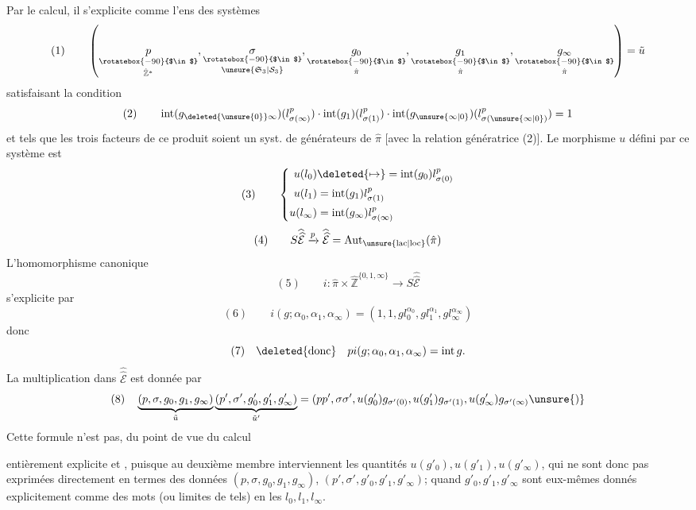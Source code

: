 Par le calcul, il s'explicite comme l'ens des systèmes
\[
(1)\qquad\left(\underset{\hat{\mathbb Z}^{*}}{\underset{\rotatebox{-90}{$\in$}}{p}},\underset{\unsure{\mathfrak S_3|\mathcal S_3}}{\underset{\rotatebox{-90}{$\in$}}{\sigma}},\underset{\hat\pi}{\underset{\rotatebox{-90}{$\in$}}{g_0}},\underset{\hat\pi}{\underset{\rotatebox{-90}{$\in$}}{g_1}},\underset{\hat\pi}{\underset{\rotatebox{-90}{$\in$}}{g_\infty}}\right)=\tilde u
\]
satisfaisant la condition
\[
(2)\qquad\operatorname{int}(g_{\deleted{\unsure{0}}\infty})(l_{\sigma(\infty)}^p)\cdot\operatorname{int}(g_1)(l_{\sigma(1)}^p)\cdot\operatorname{int}(g_{\unsure{\infty|0}})(l_{\sigma(\unsure{\infty|0})}^p)=1
\]
et tels que les trois facteurs de ce produit soient un syst. de générateurs de $\hat\pi$ [avec la relation génératrice (2)]. Le morphisme $u$ défini par ce  système est
\[
(3)\qquad\left\{\begin{aligned}
u(l_0)&\deleted{\mapsto}=\operatorname{int}(g_0)l_{\sigma(0)}^p\\
u(l_1)&=\operatorname{int}(g_1)l_{\sigma(1)}^p\\
u(l_\infty)&=\operatorname{int}(g_\infty)l_{\sigma(\infty)}^p
\end{aligned}\right.
\]
\[
(4)\qquad S\widehat{\widehat{\mathcal E}}\xrightarrow{p}\widehat{\widehat{\mathcal E}}=\operatorname{Aut}_{\unsure{\mathrm{lac}|\mathrm{loc}}}(\hat\pi)
\]
L'homomorphisme canonique
\[
(5)\qquad i:\hat\pi\times\hat{\mathbb Z}^{\{0,1,\infty\}}\longrightarrow S\widehat{\widehat{\mathcal E}}
\]
s'explicite par
\[
(6)\qquad i(g;\alpha_0,\alpha_1,\alpha_\infty)=(1,1,gl_0^{\alpha_0},gl_1^{\alpha_1},gl_\infty^{\alpha_\infty})
\]
donc
\[
(7)\quad\deleted{\text{donc}}\quad pi(g;\alpha_0,\alpha_1,\alpha_\infty)=\operatorname{int}g.
\]
La multiplication dans $\widehat{\widehat{\mathcal E}}$ est donnée par
\[
(8)\quad\underbrace{(p,\sigma,g_0,g_1,g_\infty)}_{\tilde u}\underbrace{(p',\sigma',g'_0,g'_1,g'_\infty)}_{\tilde u'}=(pp',\sigma\sigma',u(g'_0)g_{\sigma'(0)},u(g'_1)g_{\sigma'(1)},u(g'_\infty)g_{\sigma'(\infty)}\unsure{)}
\]
Cette formule n'est pas, du point de vue du calcul\unsure{,}

entièrement explicite et , puisque au deuxième membre interviennent les quantités $u(g'_0),u(g'_1),u(g'_\infty)$, qui ne sont donc pas exprimées directement en termes des  données $(p,\sigma,g_0,g_1,g_\infty)$, $(p',\sigma',g'_0,g'_1,g'_\infty)$;  quand $g'_0,g'_1,g'_\infty$ sont eux-mêmes donnés explicitement comme des mots (ou limites de tels) en les $l_0,l_1,l_\infty$.

